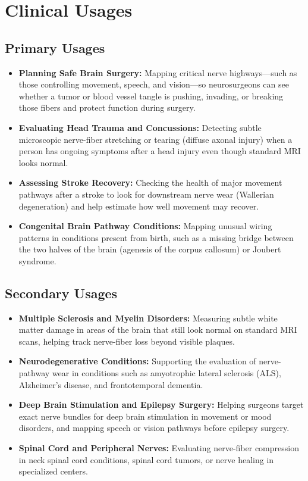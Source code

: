 \section{Clinical Usages}

\subsection{Primary Usages}

\begin{itemize}
    \item \textbf{Planning Safe Brain Surgery:} Mapping critical nerve highways---such as those controlling movement, speech, and vision---so neurosurgeons can see whether a tumor or blood vessel tangle is pushing, invading, or breaking those fibers and protect function during surgery.
    \item \textbf{Evaluating Head Trauma and Concussions:} Detecting subtle microscopic nerve-fiber stretching or tearing (diffuse axonal injury) when a person has ongoing symptoms after a head injury even though standard MRI looks normal.
    \item \textbf{Assessing Stroke Recovery:} Checking the health of major movement pathways after a stroke to look for downstream nerve wear (Wallerian degeneration) and help estimate how well movement may recover.
    \item \textbf{Congenital Brain Pathway Conditions:} Mapping unusual wiring patterns in conditions present from birth, such as a missing bridge between the two halves of the brain (agenesis of the corpus callosum) or Joubert syndrome.
\end{itemize}

\subsection{Secondary Usages}

\begin{itemize}
    \item \textbf{Multiple Sclerosis and Myelin Disorders:} Measuring subtle white matter damage in areas of the brain that still look normal on standard MRI scans, helping track nerve-fiber loss beyond visible plaques.
    \item \textbf{Neurodegenerative Conditions:} Supporting the evaluation of nerve-pathway wear in conditions such as amyotrophic lateral sclerosis (ALS), Alzheimer's disease, and frontotemporal dementia.
    \item \textbf{Deep Brain Stimulation and Epilepsy Surgery:} Helping surgeons target exact nerve bundles for deep brain stimulation in movement or mood disorders, and mapping speech or vision pathways before epilepsy surgery.
    \item \textbf{Spinal Cord and Peripheral Nerves:} Evaluating nerve-fiber compression in neck spinal cord conditions, spinal cord tumors, or nerve healing in specialized centers.
\end{itemize}


